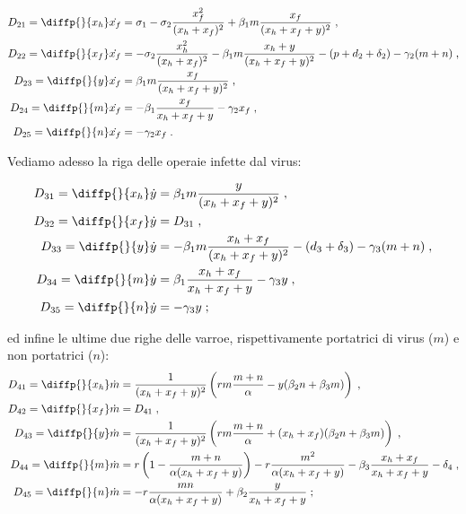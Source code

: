 \begin{equation} %
\begin{split}
D_{21} = \diffp{}{{x_h}} \dot{x_f} &= \sigma_1 - \sigma_2 \frac{x_f^2}{(x_h+x_f)^2} +
    \beta_1 m \frac{x_f}{(x_h+x_f+y)^2} \; , \\
D_{22} = \diffp{}{{x_f}} \dot{x_f} &= -\sigma_2 \frac{x_h^2}{(x_h+x_f)^2} - \beta_1 m \frac{x_h+y}{(x_h+x_f+y)^2}
    - (p + d_2 + \delta_2) - \gamma_2 (m+n) \; , \\
D_{23} = \diffp{}{y} \dot{x_f} &= \beta_1 m \frac{x_f}{(x_h+x_f+y)^2} \; , \\
D_{24} = \diffp{}{m} \dot{x_f} &= -\beta_1 \frac{x_f}{x_h+x_f+y} - \gamma_2 x_f \; , \\
D_{25} = \diffp{}{n} \dot{x_f} &= -\gamma_2 x_f \; .
\end{split}
\end{equation}

Vediamo adesso la riga delle operaie infette dal virus:

\begin{equation} %
\begin{split}
D_{31} = \diffp{}{{x_h}} \dot{y} &= \beta_1 m \frac{y}{(x_h+x_f+y)^2} \; , \\
D_{32} = \diffp{}{{x_f}} \dot{y} &= D_{31} \; , \\
D_{33} = \diffp{}{y} \dot{y} &= - \beta_1 m \frac{x_h+x_f}{(x_h+x_f+y)^2} - (d_3 + \delta_3) - \gamma_3(m+n) \; , \\
D_{34} = \diffp{}{m} \dot{y} &= \beta_1 \frac{x_h+x_f}{x_h+x_f+y} - \gamma_3 y \; , \\
D_{35} = \diffp{}{n} \dot{y} &= -\gamma_3 y \; ;
\end{split}
\end{equation}

ed infine le ultime due righe delle varroe, rispettivamente portatrici di virus ($m$) e non portatrici ($n$):
\begin{equation}
\begin{split}
D_{41} = \diffp{}{{x_h}} \dot{m} &= \frac{1}{(x_h+x_f+y)^2} \left( r m \frac{m+n}{\alpha}
    - y ( \beta_2 n + \beta_3 m ) \right) \; , \\
D_{42} = \diffp{}{{x_f}} \dot{m} &= D_{41} \; , \\
D_{43} = \diffp{}{y} \dot{m} &= \frac{1}{(x_h+x_f+y)^2} \left( r m \frac{m+n}{\alpha}
    +(x_h+x_f) ( \beta_2 n + \beta_3 m ) \right) \; , \\
D_{44} = \diffp{}{m} \dot{m} &= r \left( 1 - \frac{m+n}{\alpha (x_h+x_f+y)} \right)
    - r \frac{m^2}{\alpha (x_h+x_f+y)} - \beta_3 \frac{x_h+x_f}{x_h+x_f+y} - \delta_4 \; , \\
D_{45} = \diffp{}{n} \dot{m} &= - r \frac{m n}{\alpha (x_h +x_f+y)} + \beta_2 \frac{y}{x_h+x_f+y} \; ;
\end{split}
\end{equation}

